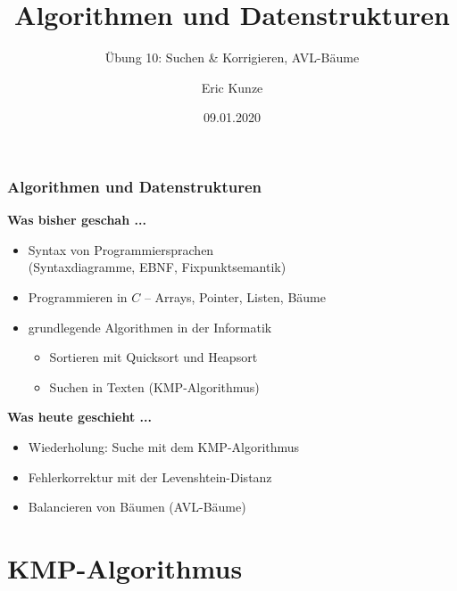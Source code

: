\documentclass{beamer}
\begin{document}
	
	\title{Algorithmen und Datenstrukturen}
	\subtitle{Übung 10: Suchen \& Korrigieren, AVL-Bäume}
	\author{Eric Kunze}
	\date{09.01.2020}

	\maketitle



\begin{frame} \frametitle{Algorithmen und Datenstrukturen}
	\textbf{Was bisher geschah ...}
	\begin{itemize}
		\item Syntax von Programmiersprachen \\
		 (Syntaxdiagramme, EBNF, Fixpunktsemantik)
		\item Programmieren in $C$ -- Arrays, Pointer, Listen, Bäume
		\item grundlegende Algorithmen in der Informatik
		\begin{itemize}
			\item Sortieren mit Quicksort und Heapsort
			\item Suchen in Texten (KMP-Algorithmus)
		\end{itemize}		
	\end{itemize}

	\pause

	\textbf{Was heute geschieht ...}
	\begin{itemize}
		\item Wiederholung: Suche mit dem KMP-Algorithmus
		\item Fehlerkorrektur mit der Levenshtein-Distanz
		\item Balancieren von Bäumen (AVL-Bäume)
	\end{itemize}
\end{frame}


\section{KMP-Algorithmus} 
\end{document}

